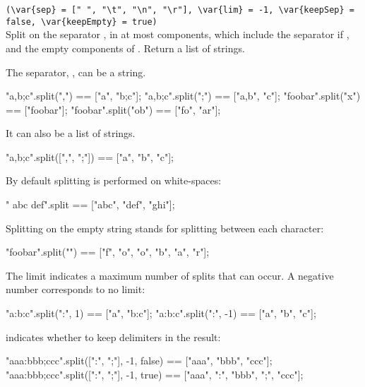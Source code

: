 \begin{urbiscriptapi}
\item {}%
  \lstinline|(\var{sep} = [" ", "\t", "\n", "\r"], \var{lim} = -1, \var{keepSep} = false, \var{keepEmpty} = true)|\\
  Split \this on the separator , in at most 
  components, which include the separator if , and the
  empty components of .  Return a list of strings.

  The separator, , can be a string.

\begin{urbiassert}
       "a,b;c".split(",") == ["a", "b;c"];
       "a,b;c".split(";") == ["a,b", "c"];
      "foobar".split("x") == ["foobar"];
     "foobar".split("ob") == ["fo", "ar"];
\end{urbiassert}

\noindent
It can also be a list of strings.

\begin{urbiassert}
"a,b;c".split([",", ";"]) == ["a", "b", "c"];
\end{urbiassert}

\noindent
By default splitting is performed on white-spaces:

\begin{urbiassert}
"  abc  def\tghi\n".split == ["abc", "def", "ghi"];
\end{urbiassert}

\noindent
Splitting on the empty string stands for splitting between each character:

\begin{urbiassert}
"foobar".split("") == ["f", "o", "o", "b", "a", "r"];
\end{urbiassert}

The limit  indicates a maximum number of splits that can occur. A
negative number corresponds to no limit:

\begin{urbiassert}
"a:b:c".split(":",  1) == ["a", "b:c"];
"a:b:c".split(":", -1) == ["a", "b", "c"];
\end{urbiassert}

 indicates whether to keep delimiters in the result:

\begin{urbiassert}
"aaa:bbb;ccc".split([":", ";"], -1, false) == ["aaa",      "bbb",      "ccc"];
"aaa:bbb;ccc".split([":", ";"], -1, true)  == ["aaa", ":", "bbb", ";", "ccc"];
\end{urbiassert}


\end{urbiscriptapi}
